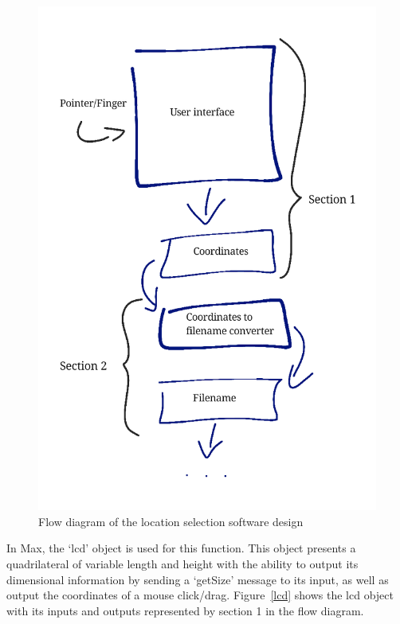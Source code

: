 \documentclass[../../main.tex]{subfiles}
\begin{document}
			\begin{figure}[H]
				\centerline{\includegraphics[scale = 0.3]{Sections/Implementation/Max/images/FlowDiagrams/Max1_V2.png}}
				\caption{Flow diagram of the location selection software design}
				\label{flowDiagram}
			\end{figure}

			In Max, the ‘lcd’ object is used for this function. This object presents a quadrilateral of variable length and height with the ability to output its dimensional information by sending a ‘getSize’ message to its input, as well as output the coordinates of a mouse click/drag. Figure~\ref{lcd} shows the lcd object with its inputs and outputs represented by section 1 in the flow diagram.
\end{document}
